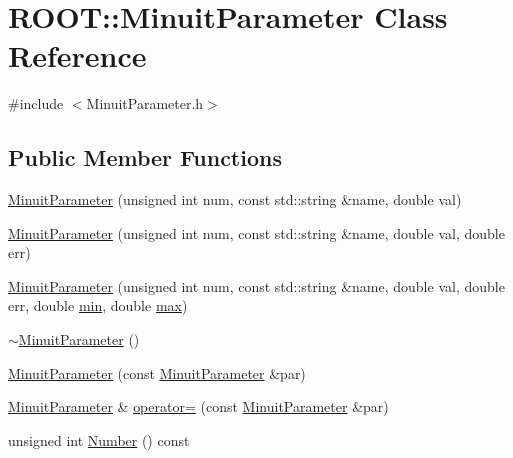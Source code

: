 \hypertarget{classROOT_1_1Minuit2_1_1MinuitParameter}{}\section{R\+O\+OT\+:\+:Minuit\+Parameter Class Reference}
\label{classROOT_1_1Minuit2_1_1MinuitParameter}


{\ttfamily \#include $<$Minuit\+Parameter.\+h$>$}

\subsection*{Public Member Functions}
\begin{DoxyCompactItemize}
\item 
\mbox{\hyperlink{classROOT_1_1Minuit2_1_1MinuitParameter_afa9a57b4990491316502a21e09b756bc}{Minuit\+Parameter}} (unsigned int num, const std\+::string \&name, double val)
\item 
\mbox{\hyperlink{classROOT_1_1Minuit2_1_1MinuitParameter_a56d290ba2abc3c599cff99187329a91a}{Minuit\+Parameter}} (unsigned int num, const std\+::string \&name, double val, double err)
\item 
\mbox{\hyperlink{classROOT_1_1Minuit2_1_1MinuitParameter_a13b433906347405bf85ef2bdf5803990}{Minuit\+Parameter}} (unsigned int num, const std\+::string \&name, double val, double err, double \mbox{\hyperlink{adat__devel_2lib_2SU3_2SU3__internal_8h_ab0f5fed3171eb00d1c5f037d9f518a23}{min}}, double \mbox{\hyperlink{adat__devel_2lib_2SU3_2SU3__internal_8h_ace7f45ceb252a2dfbf29b98bc81cb8ba}{max}})
\item 
\mbox{\hyperlink{classROOT_1_1Minuit2_1_1MinuitParameter_a487d895f06a46c8c2e1e3dbc97dd0a26}{$\sim$\+Minuit\+Parameter}} ()
\item 
\mbox{\hyperlink{classROOT_1_1Minuit2_1_1MinuitParameter_a0ac95809b18c619597764fcfabcb70fe}{Minuit\+Parameter}} (const \mbox{\hyperlink{classROOT_1_1Minuit2_1_1MinuitParameter}{Minuit\+Parameter}} \&par)
\item 
\mbox{\hyperlink{classROOT_1_1Minuit2_1_1MinuitParameter}{Minuit\+Parameter}} \& \mbox{\hyperlink{classROOT_1_1Minuit2_1_1MinuitParameter_ae26eba9113194d198e988d7c87057398}{operator=}} (const \mbox{\hyperlink{classROOT_1_1Minuit2_1_1MinuitParameter}{Minuit\+Parameter}} \&par)
\item 
unsigned int \mbox{\hyperlink{classROOT_1_1Minuit2_1_1MinuitParameter_aaa2361c2954576d90a0dffcf2e049eea}{Number}} () const

\end{DoxyCompactItemize}

